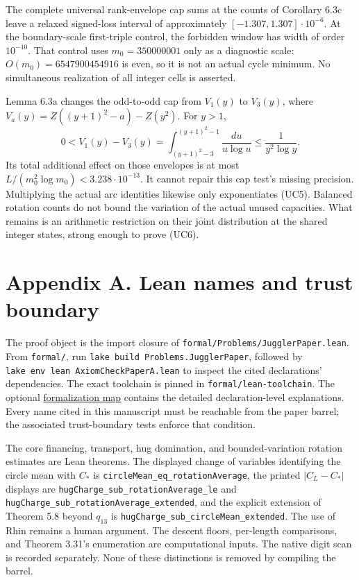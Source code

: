 \documentclass[12pt]{article}
\begin{document}
The complete universal rank-envelope cap sums at the counts of Corollary
6.3c leave a relaxed signed-loss interval of approximately
\([-1.307,1.307]\cdot10^{-6}\). At the boundary-scale first-triple
control, the forbidden window has width of order \(10^{-10}\). That
control uses \(m_0=350000001\) only as a diagnostic scale:
\(O(m_0)=6547900454916\) is even, so it is not an actual cycle minimum.
No simultaneous realization of all integer cells is asserted.

Lemma 6.3a changes the odd-to-odd cap from \(V_1(y)\) to \(V_3(y)\),
where \(V_a(y)=Z((y+1)^2-a)-Z(y^2)\). For \(y>1\), \[
0<V_1(y)-V_3(y)
=\int_{(y+1)^2-3}^{(y+1)^2-1}\frac{du}{u\log u}
\le\frac1{y^2\log y}.
\tag{UC7}
\] Its total additional effect on those envelopes is at most
\(L/(m_0^2\log m_0)<3.238\cdot10^{-13}\). It cannot repair this cap
test's missing precision. Multiplying the actual arc identities likewise
only exponentiates (UC5). Balanced rotation counts do not bound the
variation of the actual unused capacities. What remains is an arithmetic
restriction on their joint distribution at the shared integer states,
strong enough to prove (UC6).

\section{Appendix A. Lean names and trust
boundary}\label{appendix-a.-lean-names-and-trust-boundary}

The proof object is the import closure of
\texttt{\nolinkurl{formal/Problems/JugglerPaper.lean}}. From
\texttt{\nolinkurl{formal/}}, run
\texttt{lake\ build\ Problems.JugglerPaper}, followed by
\texttt{lake\ env\ lean\ AxiomCheckPaperA.lean} to inspect the cited
declarations' dependencies. The exact toolchain is pinned in
\texttt{\nolinkurl{formal/lean-toolchain}}. The optional
\href{juggler_finite_dynamics_formalization.md}{formalization map}
contains the detailed declaration-level explanations. Every name cited
in this manuscript must be reachable from the paper barrel; the
associated trust-boundary tests enforce that condition.

The core financing, transport, hug domination, and bounded-variation
rotation estimates are Lean theorems. The displayed change of variables
identifying the circle mean with \(C_*\) is
\texttt{\nolinkurl{circleMean_eq_rotationAverage}}, the printed
\(|C_L-C_*|\) displays are
\texttt{\nolinkurl{hugCharge_sub_rotationAverage_le}} and
\texttt{\nolinkurl{hugCharge_sub_rotationAverage_extended}}, and the
explicit extension of Theorem 5.8 beyond \(q_{13}\) is
\texttt{\nolinkurl{hugCharge_sub_circleMean_extended}}. The use of Rhin
remains a human argument. The descent floors, per-length comparisons,
and Theorem 3.31's enumeration are computational inputs. The native
digit scan is recorded separately. None of these distinctions is removed
by compiling the barrel.
\end{document}

